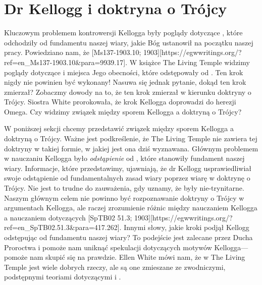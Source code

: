\chapter{Dr Kellogg i doktryna o Trójcy}

Kluczowym problemem kontrowersji  Kellogga były poglądy dotyczące , które odchodziły od fundamentu naszej wiary, jakie Bóg ustanowił na początku naszej pracy. Powiedziano nam, że [Ms137-1903.10; 1903][https://egwwritings.org/?ref=en\_Ms137-1903.10&para=9939.17]. W książce The Living Temple widzimy poglądy dotyczące  i miejsca Jego obecności, które odstępowały od . Ten krok nigdy nie powinien być wykonany! Nasuwa się jednak pytanie, dokąd ten krok zmierzał? Zobaczmy dowody na to, że ten krok zmierzał w kierunku doktryny o Trójcy. Siostra White prorokowała, że krok Kellogga doprowadzi do herezji Omega. Czy widzimy związek między sporem Kellogga a doktryną o Trójcy?

W poniższej sekcji chcemy przedstawić związek między sporem Kellogga a doktryną o Trójcy. Ważne jest podkreślenie, że The Living Temple nie zawiera tej doktryny w takiej formie, w jakiej jest ona dziś wyznawana. Głównym problemem w nauczaniu Kellogga było \textit{odstąpienie} od , które stanowiły fundament naszej wiary. Informacje, które przedstawimy, ujawniają, że dr Kellogg usprawiedliwiał swoje odstąpienie od fundamentalnych zasad wiary poprzez wiarę w doktrynę o Trójcy. Nie jest to trudne do zauważenia, gdy uznamy, że  były nie-trynitarne. Naszym głównym celem nie powinno być rozpoznawanie doktryny o Trójcy w argumentach Kellogga, ale raczej zrozumienie różnic między nauczaniem Kellogga a nauczaniem  dotyczących [SpTB02 51.3; 1903][https://egwwritings.org/?ref=en\_SpTB02.51.3&para=417.262]. Innymi słowy, jakie kroki podjął Kellogg odstępując od fundamentu naszej wiary? To podejście jest zalecane przez Ducha Proroctwa i pomoże nam uniknąć spekulacji dotyczących motywów Kellogga—pomoże nam skupić się na prawdzie. Ellen White mówi nam, że w The Living Temple jest wiele dobrych rzeczy, ale są one zmieszane ze zwodniczymi, podstępnymi teoriami dotyczącymi  i .

